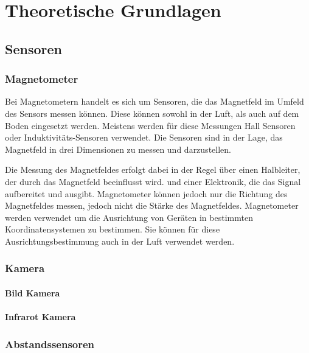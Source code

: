 \chapter{Theoretische Grundlagen}


\section{Sensoren} \label{sensoren:section}

    \subsection{Magnetometer} \label{magnetometer:subsection}

    Bei Magnetometern handelt es sich um Sensoren, die das Magnetfeld im Umfeld des Sensors messen können.
    Diese können sowohl in der Luft, als auch auf dem Boden eingesetzt werden.
    Meistens werden für diese Messungen Hall Sensoren oder Induktivitäts-Sensoren verwendet.
    Die Sensoren sind in der Lage, das Magnetfeld in drei Dimensionen zu messen und darzustellen.

    Die Messung des Magnetfeldes erfolgt dabei in der Regel über einen Halbleiter, der durch das Magnetfeld beeinflusst wird.
    und einer Elektronik, die das Signal aufbereitet und ausgibt.
    Magnetometer können jedoch nur die Richtung des Magnetfeldes messen, jedoch nicht die Stärke des Magnetfeldes.
    Magnetometer werden verwendet um die Ausrichtung von Geräten in bestimmten Koordinatensystemen zu bestimmen.
    Sie können für diese Ausrichtungsbestimmung auch in der Luft verwendet werden. 

    \subsection{Kamera} \label{kamera:section}

        \subsubsection{Bild Kamera} \label{bild_kamera:subsubsection}

        \subsubsection{Infrarot Kamera} \label{infrarot_kamera:subsubsection}

    \subsection{Abstandssensoren} \label{abstandssensoren:subsection}

